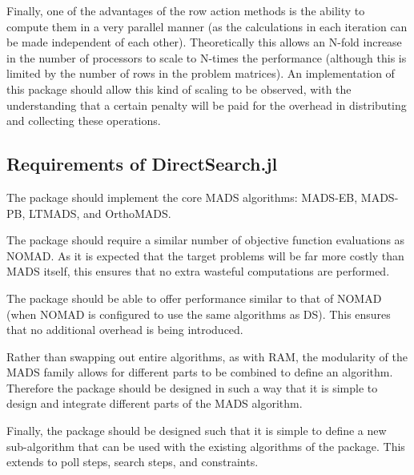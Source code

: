 Finally, one of the advantages of the row action methods is the ability to compute them in a very parallel manner (as the calculations in each iteration can be made independent of each other). Theoretically this allows an N-fold increase in the number of processors to scale to N-times the performance (although this is limited by the number of rows in the problem matrices). An implementation of this package should allow this kind of scaling to be observed, with the understanding that a certain penalty will be paid for the overhead in distributing and collecting these operations.

\subsection{Requirements of DirectSearch.jl}\label{sub:ds_req}

The package should implement the core \ac{MADS} algorithms: \ac{MADS-EB}, \ac{MADS-PB}, \ac{LTMADS}, and \ac{OrthoMADS}.

The package should require a similar number of objective function evaluations as NOMAD. As it is expected that the target problems will be far more costly than MADS itself, this ensures that no extra wasteful computations are performed.

The package should be able to offer performance similar to that of NOMAD (when NOMAD is configured to use the same algorithms as \ac{DS}). This ensures that no additional overhead is being introduced.

Rather than swapping out entire algorithms, as with \ac{RAM}, the modularity of the \ac{MADS} family allows for different parts to be combined to define an algorithm. Therefore the package should be designed in such a way that it is simple to design and integrate different parts of the \ac{MADS} algorithm.

Finally, the package should be designed such that it is simple to define a new sub-algorithm that can be used with the existing algorithms of the package. This extends to poll steps, search steps, and constraints.